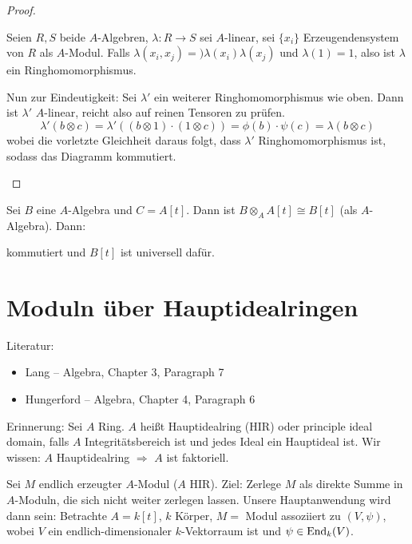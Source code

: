 \documentclass[12pt,a4paper]{scrartcl}
\theoremstyle{cplain}
\theoremstyle{cdef}
\begin{document}
\begin{proof}
\begin{enumerate}
		\begin{bem}
			Seien $R,S$ beide $A$-Algebren, $\lambda\colon R\to S$ sei $A$-linear, sei $\{x_i\}$ Erzeugendensystem von $R$ als $A$-Modul. Falls $\lambda(x_i,x_j) =)\lambda(x_i)\lambda(x_j)$ und $\lambda(1) = 1$, also ist $\lambda$ ein Ringhomomorphismus.
		\end{bem}
	
		Nun zur Eindeutigkeit: Sei $\lambda'$ ein weiterer Ringhomomorphismus wie oben. Dann ist $\lambda'$ $A$-linear, reicht also auf reinen Tensoren zu prüfen.
		$$\lambda'(b\otimes c) = \lambda'((b\otimes 1)\cdot(1\otimes c)) = \phi(b)\cdot \psi(c) = \lambda(b\otimes c)$$
		wobei die vorletzte Gleichheit daraus folgt, dass $\lambda'$ Ringhomomorphismus ist, sodass das Diagramm kommutiert.
	\end{enumerate}
	
\end{proof}

\begin{bsp}
	Sei $B$ eine $A$-Algebra und $C= A[t]$. Dann ist $B\otimes_AA[t]\cong B[t]$ (als $A$-Algebra). Dann:	
	\begin{center}
	\end{center}
	kommutiert und $B[t]$ ist universell dafür.
\end{bsp}


\section{Moduln über Hauptidealringen}
Literatur:\begin{itemize}
	\item Lang -- Algebra, Chapter 3, Paragraph 7
	\item Hungerford -- Algebra, Chapter 4, Paragraph 6
\end{itemize}
Erinnerung: Sei $A$ Ring. $A$ heißt Hauptidealring (HIR) oder principle ideal domain, falls $A$ Integritätsbereich ist und jedes Ideal ein Hauptideal ist.
Wir wissen: $A$ Hauptidealring $\Rightarrow$ $A$ ist faktoriell.

Sei $M$ endlich erzeugter $A$-Modul ($A$ HIR). Ziel: Zerlege $M$ als direkte Summe in $A$-Moduln, die sich nicht weiter zerlegen lassen. Unsere Hauptanwendung wird dann sein: Betrachte $A = k[t]$, $k$ Körper, $M=$ Modul assoziiert zu $(V,\psi)$, wobei $V$ ein endlich-dimensionaler $k$-Vektorraum ist und $\psi\in\operatorname{End}_k(V)$.
\end{document}

